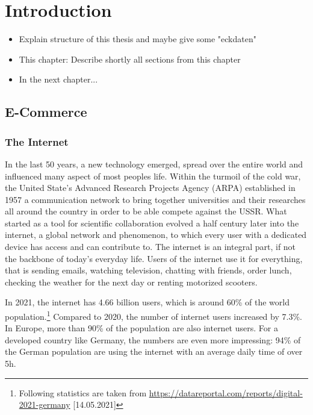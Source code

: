 \chapter{Introduction}

\begin{itemize}
	\item Explain structure of this thesis and maybe give some "eckdaten"
	\item This chapter: Describe shortly all sections from this chapter
	\item In the next chapter...
\end{itemize}




\section{E-Commerce}


\subsection{The Internet}

In the last 50 years, a new technology emerged, spread over the entire world and influenced many aspect of most peoples life.
Within the turmoil of the cold war, the United State's Advanced Research Projects Agency (ARPA) established in 1957 a communication network to bring together universities and their researches all around the country in order to be able compete against the USSR.
What started as a tool for scientific collaboration evolved a half century later into the internet, a global network and phenomenon, to which every user with a dedicated device has access and can contribute to.
The internet is an integral part, if not the backbone of today's everyday life.
Users of the internet use it for everything, that is sending emails, watching television, chatting with friends, 
order lunch, checking the weather for the next day or renting motorized scooters.


In 2021, the internet has 4.66 billion users, which is around 60\% of the world population.\footnote{Following statistics are taken from \url{https://datareportal.com/reports/digital-2021-germany} [14.05.2021]}
Compared to 2020, the number of internet users increased by 7.3\%.
In Europe, more than 90\% of the population are also internet users.
For a developed country like Germany, the numbers are even more impressing:
94\% of the German population are using the internet with an average daily time of over 5h.

